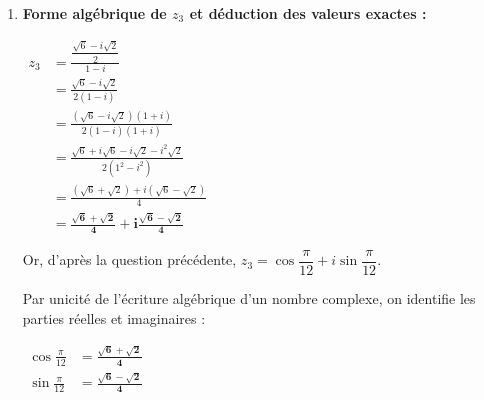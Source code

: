 \documentclass[12pt,a4paper]{article}
\begin{document}
\begin{enumerate}
\begin{itemize}
        $
        \begin{aligned}
            |z_3| &= \frac{|z_1|}{|z_2|}\\
            &= \frac{\sqrt{2}}{\sqrt{2}}\\
            &= \mathbf{1}
        \end{aligned}
        $
        
        $
        \begin{aligned}
            \arg(z_3) &\equiv \arg(z_1) - \arg(z_2) \pmod{2\pi}\\
            &\equiv -\frac{\pi}{6} - \left(-\frac{\pi}{4}\right) \pmod{2\pi}\\
            &\equiv -\frac{\pi}{6} + \frac{\pi}{4}\\
            &\equiv \frac{-2\pi + 3\pi}{12}\\
            &\equiv \mathbf{\frac{\pi}{12}} \pmod{2\pi}
        \end{aligned}
        $
        
        On en déduit l'écriture trigonométrique de $z_3$ :
        
        $
        z_3 = \mathbf{\cos\frac{\pi}{12} + i\sin\frac{\pi}{12}}
        $
    \end{itemize}

    \item \textbf{Forme algébrique de $z_3$ et déduction des valeurs exactes :}
    
    $
    \begin{aligned}
        z_3 &= \frac{\dfrac{\sqrt{6} - i\sqrt{2}}{2}}{1 - i}\\
        &= \frac{\sqrt{6} - i\sqrt{2}}{2(1 - i)}\\
        &= \frac{(\sqrt{6} - i\sqrt{2})(1 + i)}{2(1 - i)(1 + i)}\\
        &= \frac{\sqrt{6} + i\sqrt{6} - i\sqrt{2} - i^2\sqrt{2}}{2(1^2 - i^2)}\\
        &= \frac{(\sqrt{6} + \sqrt{2}) + i(\sqrt{6} - \sqrt{2})}{4}\\
        &= \mathbf{\frac{\sqrt{6} + \sqrt{2}}{4} + i\frac{\sqrt{6} - \sqrt{2}}{4}}
    \end{aligned}
    $
    
    Or, d'après la question précédente, $z_3 = \cos\dfrac{\pi}{12} + i\sin\dfrac{\pi}{12}$.
    
    Par unicité de l'écriture algébrique d'un nombre complexe, on identifie les parties réelles et imaginaires :
    
    $
    \begin{aligned}
        \cos\frac{\pi}{12} &= \mathbf{\frac{\sqrt{6} + \sqrt{2}}{4}} \\
        \sin\frac{\pi}{12} &= \mathbf{\frac{\sqrt{6} - \sqrt{2}}{4}}
    \end{aligned}
    $
\end{enumerate}
\end{document}
